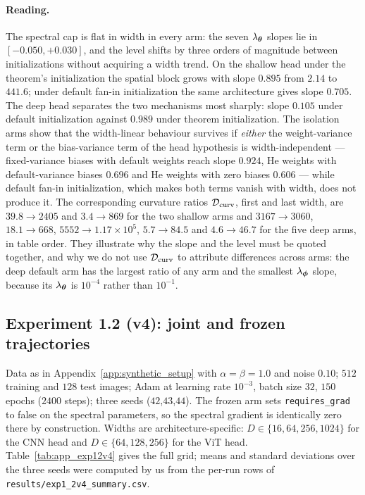 \paragraph{Reading.} The spectral cap is flat in width in every arm: the seven
$\lambda_{\boldsymbol{\theta}}$ slopes lie in $[-0.050, +0.030]$, and the level shifts by
three orders of magnitude between initializations without acquiring a width
trend. On the shallow head under the theorem's initialization the spatial
block grows with slope $0.895$ from $2.14$ to $441.6$; under default fan-in
initialization the same architecture gives slope $0.705$. The deep head
separates the two mechanisms most sharply: slope $0.105$ under default
initialization against $0.989$ under theorem initialization. The isolation
arms show that the width-linear behaviour survives if \emph{either} the
weight-variance term or the bias-variance term of the head hypothesis is
width-independent --- fixed-variance biases with default weights reach slope
$0.924$, He weights with default-variance biases $0.696$ and He weights with
zero biases $0.606$ --- while default fan-in initialization, which makes both
terms vanish with width, does not produce it. The corresponding curvature
ratios $\mathcal{D}_{\mathrm{curv}}$, first and last width, are $39.8 \to 2405$ and $3.4 \to 869$
for the two shallow arms and $3167 \to 3060$, $18.1 \to 668$, $5552 \to
1.17\times10^{5}$, $5.7 \to 84.5$ and $4.6 \to 46.7$ for the five deep arms, in
table order. They illustrate why the slope and the level must be quoted
together, and why we do not use $\mathcal{D}_{\mathrm{curv}}$ to attribute differences across arms:
the deep default arm has the largest ratio of any arm and the smallest
$\lambda_{\boldsymbol{\phi}}$ slope, because its $\lambda_{\boldsymbol{\theta}}$ is $10^{-4}$ rather than
$10^{-1}$.

\subsection{Experiment 1.2 (v4): joint and frozen trajectories}
\label{app:exp12v4}

Data as in Appendix~\ref{app:synthetic_setup} with $\alpha = \beta = 1.0$ and
noise $0.10$; $512$ training and $128$ test images; Adam at learning rate
$10^{-3}$, batch size $32$, $150$ epochs ($2400$ steps); three seeds
($42$,$43$,$44$). The frozen arm sets \texttt{requires\_grad} to false on the
spectral parameters, so the spectral gradient is identically zero there by
construction. Widths are architecture-specific: $D \in \{16, 64, 256, 1024\}$
for the CNN head and $D \in \{64, 128, 256\}$ for the ViT head.
Table~\ref{tab:app_exp12v4} gives the full grid; means and standard deviations
over the three seeds were computed by us from the per-run rows of
\texttt{results/exp1\_2v4\_summary.csv}.

